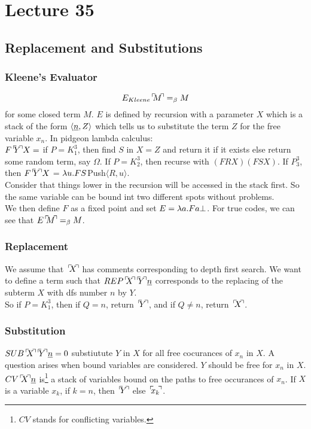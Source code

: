\chapter{Lecture 35}
\pagestyle{fancy}

\section{Replacement and Substitutions}
\subsection{Kleene's Evaluator}
\begin{equation*}
  E_{Kleene}\godnum{M} =_{\beta} M
\end{equation*}
for some closed term $M$. $E$ is defined by recursion with a parameter $X$ which is a stack of the form $\langle \uline{n}, Z\rangle$ which tells us to substitute the term $Z$ for the free variable $x_n$. In pidgeon lambda calculus:\\

$F\godnum{Y}X =$ if $P = K_1^3$, then find $S$ in $X = Z$ and return it if it exists else return some random term, say $\Omega$. If $P = K_2^3$, then recurse with $(FRX)(FSX)$. If $P_3^3$, then $F\godnum{Y}X$ = $\lambda u.FS$Push$\langle R,u\rangle$.\\

Consider that things lower in the recursion will be accessed in the stack first. So the same variable can be bound int two different spots without problems.\\

We then define $F$ as a fixed point and set $E = \lambda a.Fa\bot$. For true codes, we can see that $E\godnum{M} =_\beta M$.\\

\subsection{Replacement}
We assume that $\godnum{X}$ has comments corresponding to depth first search. We want to define a term such that $REP\godnum{X}\godnum{Y}\uline{n}$ corresponds to the replacing of the subterm $X$ with dfs number $n$ by $Y$.\\

So if $P = K_1^3$, then if $Q = n$, return $\godnum{Y}$, and if $Q \not= n$, return $\godnum{X}$.

\subsection{Substitution}
$SUB\godnum{X}\godnum{Y}\uline{n} = 0$ substiutute $Y$ in $X$ for all free cocurances of $x_n$ in $X$. A question arises when bound variables are considered. $Y$ should be free for $x_n$ in $X$. $CV\godnum{X}\uline{n}$ is\footnote{$CV$ stands for conflicting variables.} a stack of variables bound on the paths to free occurances of $x_n$. If $X$ is a variable $x_k$, if $k = n$, then $\godnum{Y}$ else $\godnum{x_k}$.
